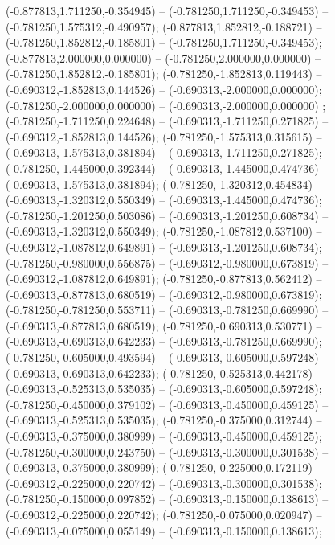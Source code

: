  (-0.877813,1.711250,-0.354945) -- (-0.781250,1.711250,-0.349453) -- (-0.781250,1.575312,-0.490957);
 (-0.877813,1.852812,-0.188721) -- (-0.781250,1.852812,-0.185801) -- (-0.781250,1.711250,-0.349453);
 (-0.877813,2.000000,0.000000) -- (-0.781250,2.000000,0.000000) -- (-0.781250,1.852812,-0.185801);
 (-0.781250,-1.852813,0.119443) -- (-0.690312,-1.852813,0.144526) -- (-0.690313,-2.000000,0.000000);
 (-0.781250,-2.000000,0.000000) -- (-0.690313,-2.000000,0.000000) ;
 (-0.781250,-1.711250,0.224648) -- (-0.690313,-1.711250,0.271825) -- (-0.690312,-1.852813,0.144526);
 (-0.781250,-1.575313,0.315615) -- (-0.690313,-1.575313,0.381894) -- (-0.690313,-1.711250,0.271825);
 (-0.781250,-1.445000,0.392344) -- (-0.690313,-1.445000,0.474736) -- (-0.690313,-1.575313,0.381894);
 (-0.781250,-1.320312,0.454834) -- (-0.690313,-1.320312,0.550349) -- (-0.690313,-1.445000,0.474736);
 (-0.781250,-1.201250,0.503086) -- (-0.690313,-1.201250,0.608734) -- (-0.690313,-1.320312,0.550349);
 (-0.781250,-1.087812,0.537100) -- (-0.690312,-1.087812,0.649891) -- (-0.690313,-1.201250,0.608734);
 (-0.781250,-0.980000,0.556875) -- (-0.690312,-0.980000,0.673819) -- (-0.690312,-1.087812,0.649891);
 (-0.781250,-0.877813,0.562412) -- (-0.690313,-0.877813,0.680519) -- (-0.690312,-0.980000,0.673819);
 (-0.781250,-0.781250,0.553711) -- (-0.690313,-0.781250,0.669990) -- (-0.690313,-0.877813,0.680519);
 (-0.781250,-0.690313,0.530771) -- (-0.690313,-0.690313,0.642233) -- (-0.690313,-0.781250,0.669990);
 (-0.781250,-0.605000,0.493594) -- (-0.690313,-0.605000,0.597248) -- (-0.690313,-0.690313,0.642233);
 (-0.781250,-0.525313,0.442178) -- (-0.690313,-0.525313,0.535035) -- (-0.690313,-0.605000,0.597248);
 (-0.781250,-0.450000,0.379102) -- (-0.690313,-0.450000,0.459125) -- (-0.690313,-0.525313,0.535035);
 (-0.781250,-0.375000,0.312744) -- (-0.690313,-0.375000,0.380999) -- (-0.690313,-0.450000,0.459125);
 (-0.781250,-0.300000,0.243750) -- (-0.690313,-0.300000,0.301538) -- (-0.690313,-0.375000,0.380999);
 (-0.781250,-0.225000,0.172119) -- (-0.690312,-0.225000,0.220742) -- (-0.690313,-0.300000,0.301538);
 (-0.781250,-0.150000,0.097852) -- (-0.690313,-0.150000,0.138613) -- (-0.690312,-0.225000,0.220742);
 (-0.781250,-0.075000,0.020947) -- (-0.690313,-0.075000,0.055149) -- (-0.690313,-0.150000,0.138613);

